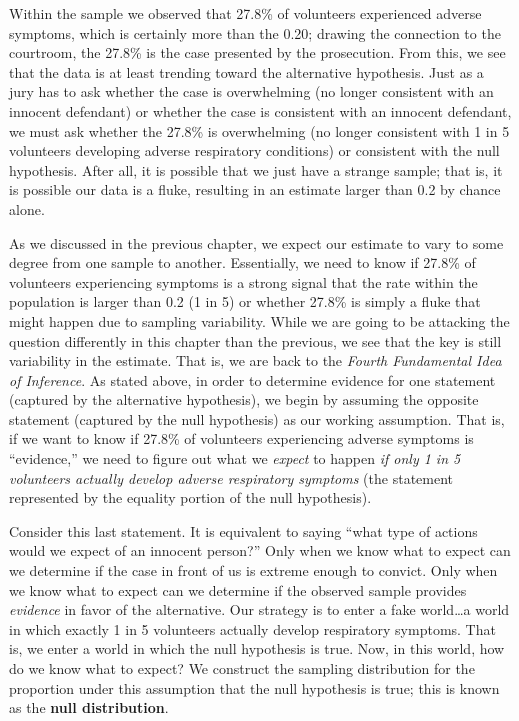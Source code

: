\documentclass[
  letterpaper,
  DIV=11,
  numbers=noendperiod]{scrreprt}
\theoremstyle{definition}
\theoremstyle{definition}
\theoremstyle{plain}
\theoremstyle{remark}
\begin{document}
Within the sample we observed that 27.8\% of volunteers experienced
adverse symptoms, which is certainly more than the 0.20; drawing the
connection to the courtroom, the 27.8\% is the case presented by the
prosecution. From this, we see that the data is at least trending toward
the alternative hypothesis. Just as a jury has to ask whether the case
is overwhelming (no longer consistent with an innocent defendant) or
whether the case is consistent with an innocent defendant, we must ask
whether the 27.8\% is overwhelming (no longer consistent with 1 in 5
volunteers developing adverse respiratory conditions) or consistent with
the null hypothesis. After all, it is possible that we just have a
strange sample; that is, it is possible our data is a fluke, resulting
in an estimate larger than 0.2 by chance alone.

As we discussed in the previous chapter, we expect our estimate to vary
to some degree from one sample to another. Essentially, we need to know
if 27.8\% of volunteers experiencing symptoms is a strong signal that
the rate within the population is larger than 0.2 (1 in 5) or whether
27.8\% is simply a fluke that might happen due to sampling variability.
While we are going to be attacking the question differently in this
chapter than the previous, we see that the key is still variability in
the estimate. That is, we are back to the \emph{Fourth Fundamental Idea
of Inference}. As stated above, in order to determine evidence for one
statement (captured by the alternative hypothesis), we begin by assuming
the opposite statement (captured by the null hypothesis) as our working
assumption. That is, if we want to know if 27.8\% of volunteers
experiencing adverse symptoms is ``evidence,'' we need to figure out
what we \emph{expect} to happen \emph{if only 1 in 5 volunteers actually
develop adverse respiratory symptoms} (the statement represented by the
equality portion of the null hypothesis).

Consider this last statement. It is equivalent to saying ``what type of
actions would we expect of an innocent person?'' Only when we know what
to expect can we determine if the case in front of us is extreme enough
to convict. Only when we know what to expect can we determine if the
observed sample provides \emph{evidence} in favor of the alternative.
Our strategy is to enter a fake world\ldots a world in which exactly 1
in 5 volunteers actually develop respiratory symptoms. That is, we enter
a world in which the null hypothesis is true. Now, in this world, how do
we know what to expect? We construct the sampling distribution for the
proportion under this assumption that the null hypothesis is true; this
is known as the \textbf{null distribution}.
\end{document}

